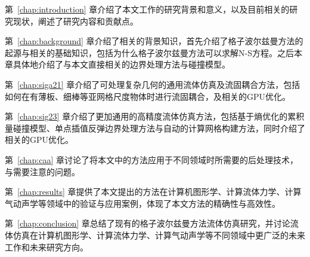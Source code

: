 第~\ref{chap:introduction} 章介绍了本文工作的研究背景和意义，以及目前相关的研究现状，阐述了研究内容和贡献点。

第~\ref{chap:background} 章介绍了相关的背景知识，首先介绍了格子波尔兹曼方法的起源与相关的基础知识，包括为什么格子波尔兹曼方法可以求解N-S方程。之后本章具体地介绍了与本文直接相关的边界处理方法与碰撞模型。

第~\ref{chap:siga21} 章介绍了可处理复杂几何的通用流体仿真及流固耦合方法，包括如何在有薄板、细棒等亚网格尺度物体时进行流固耦合，及相关的GPU优化。

第~\ref{chap:sig23} 章介绍了更加通用的高精度流体仿真方法，包括基于熵优化的累积量碰撞模型、单点插值反弹边界处理方法与自动的计算网格构建方法，同时介绍了相关的GPU优化。

第~\ref{chap:caa} 章讨论了将本文中的方法应用于不同领域时所需要的后处理技术，与需要注意的问题。

第~\ref{chap:results} 章提供了本文提出的方法在计算机图形学、计算流体力学、计算气动声学等领域中的验证与应用案例，体现了本文方法的精确性与高效性。

第~\ref{chap:conclusion} 章总结了现有的格子波尔兹曼方法流体仿真研究，并讨论流体仿真在计算机图形学、计算流体力学、计算气动声学等不同领域中更广泛的未来工作和未来研究方向。